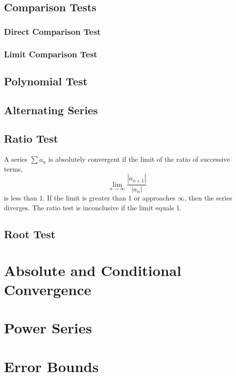 \documentclass[letterpaper]{report}
\theoremstyle{definition}
\begin{document}
\subsection{Comparison Tests}

\subsubsection{Direct Comparison Test}

\subsubsection{Limit Comparison Test}

\subsection{Polynomial Test}

\subsection{Alternating Series}

\subsection{Ratio Test}
A series $\sum{a_n}$ is absolutely convergent if the limit of the ratio
of successive terms,
\[ \lim_{n \rightarrow \infty}\frac{|a_{n+1}|}{|a_n|} \]
is less than 1. If the limit is greater than 1 or approaches $\infty$, then
the series diverges. The ratio test is inconclusive if the limit equals 1.


\subsection{Root Test}

\section{Absolute and Conditional Convergence}

\section{Power Series}

\section{Error Bounds}
\end{document}
